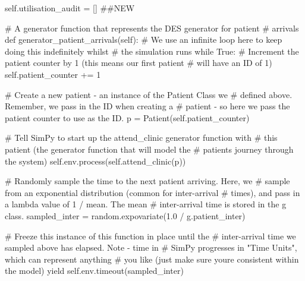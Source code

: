 \documentclass[
  letterpaper,
  DIV=11,
  numbers=noendperiod]{scrreprt}
\newenvironment{Shaded}{\begin{snugshade}}{\end{snugshade}}
\newcommand{\CommentTok}[1]{\textcolor[rgb]{0.37,0.37,0.37}{#1}}
\newcommand{\ControlFlowTok}[1]{\textcolor[rgb]{0.00,0.23,0.31}{#1}}
\newcommand{\DecValTok}[1]{\textcolor[rgb]{0.68,0.00,0.00}{#1}}
\newcommand{\FloatTok}[1]{\textcolor[rgb]{0.68,0.00,0.00}{#1}}
\newcommand{\KeywordTok}[1]{\textcolor[rgb]{0.00,0.23,0.31}{#1}}
\newcommand{\NormalTok}[1]{\textcolor[rgb]{0.00,0.23,0.31}{#1}}
\newcommand{\OperatorTok}[1]{\textcolor[rgb]{0.37,0.37,0.37}{#1}}
\newcommand{\VariableTok}[1]{\textcolor[rgb]{0.07,0.07,0.07}{#1}}
\begin{document}
\begin{tcolorbox}
\begin{Shaded}
\begin{Highlighting}[]
        \VariableTok{self}\NormalTok{.utilisation\_audit }\OperatorTok{=}\NormalTok{ [] }\CommentTok{\#\#NEW}

    \CommentTok{\# A generator function that represents the DES generator for patient}
    \CommentTok{\# arrivals}
    \KeywordTok{def}\NormalTok{ generator\_patient\_arrivals(}\VariableTok{self}\NormalTok{):}
        \CommentTok{\# We use an infinite loop here to keep doing this indefinitely whilst}
        \CommentTok{\# the simulation runs}
        \ControlFlowTok{while} \VariableTok{True}\NormalTok{:}
            \CommentTok{\# Increment the patient counter by 1 (this means our first patient}
            \CommentTok{\# will have an ID of 1)}
            \VariableTok{self}\NormalTok{.patient\_counter }\OperatorTok{+=} \DecValTok{1}

            \CommentTok{\# Create a new patient {-} an instance of the Patient Class we}
            \CommentTok{\# defined above.  Remember, we pass in the ID when creating a}
            \CommentTok{\# patient {-} so here we pass the patient counter to use as the ID.}
\NormalTok{            p }\OperatorTok{=}\NormalTok{ Patient(}\VariableTok{self}\NormalTok{.patient\_counter)}

            \CommentTok{\# Tell SimPy to start up the attend\_clinic generator function with}
            \CommentTok{\# this patient (the generator function that will model the}
            \CommentTok{\# patient\textquotesingle{}s journey through the system)}
            \VariableTok{self}\NormalTok{.env.process(}\VariableTok{self}\NormalTok{.attend\_clinic(p))}

            \CommentTok{\# Randomly sample the time to the next patient arriving.  Here, we}
            \CommentTok{\# sample from an exponential distribution (common for inter{-}arrival}
            \CommentTok{\# times), and pass in a lambda value of 1 / mean.  The mean}
            \CommentTok{\# inter{-}arrival time is stored in the g class.}
\NormalTok{            sampled\_inter }\OperatorTok{=}\NormalTok{ random.expovariate(}\FloatTok{1.0} \OperatorTok{/}\NormalTok{ g.patient\_inter)}

            \CommentTok{\# Freeze this instance of this function in place until the}
            \CommentTok{\# inter{-}arrival time we sampled above has elapsed.  Note {-} time in}
            \CommentTok{\# SimPy progresses in "Time Units", which can represent anything}
            \CommentTok{\# you like (just make sure you\textquotesingle{}re consistent within the model)}
            \ControlFlowTok{yield} \VariableTok{self}\NormalTok{.env.timeout(sampled\_inter)}


\end{Highlighting}
\end{Shaded}
\end{tcolorbox}
\end{document}
